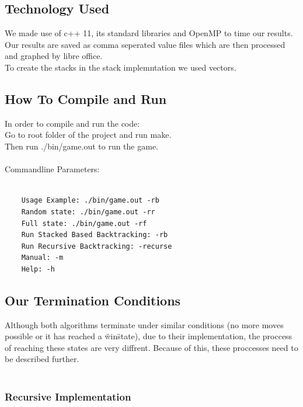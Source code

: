 \documentclass[a4paper]{article}
\begin{document}
\subsection{Technology Used}
We made use of c++ 11, its standard libraries and OpenMP to time our results. Our results are saved as comma seperated value files which are then processed and graphed by libre office.\\
To create the stacks in the stack implemntation we used vectors.\\


\subsection{How To Compile and Run}
In order to compile and run the code:\\
Go to root folder of the project and run make.\\
Then run ./bin/game.out to run the game.
\\\\
\noindent Commandline Parameters:
\begin{lstlisting}
	
	Usage Example: ./bin/game.out -rb
	Random state: ./bin/game.out -rr
	Full state: ./bin/game.out -rf
	Run Stacked Based Backtracking: -rb
	Run Recursive Backtracking: -recurse
	Manual: -m
	Help: -h
\end{lstlisting}

\subsection{Our Termination Conditions}
Although both algorithms terminate under similar conditions (no more moves possible or it has reached a \"win\" state), due to their implementation, the proccess of reaching these states are very diffrent. Because of this, these proccesses need to be described further.\\\
\subsubsection{Recursive Implementation}
\end{document}

